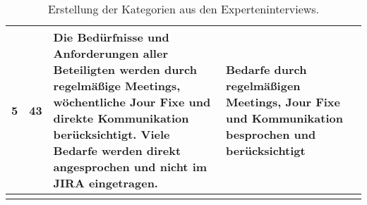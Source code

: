 \begin{longtable}{| p{0.5cm} | p{0.5cm} | p{4cm} | p{4cm} | p{4cm} |}
	\cline{1-4}
	5 & 43 & Die Bedürfnisse und Anforderungen aller Beteiligten werden durch regelmäßige Meetings, wöchentliche Jour Fixe und direkte Kommunikation berücksichtigt. Viele Bedarfe werden direkt angesprochen und nicht im JIRA eingetragen. & Bedarfe durch regelmäßigen Meetings, Jour Fixe und Kommunikation besprochen und berücksichtigt & \\ 
	\hline
	\caption{Erstellung der Kategorien aus den Experteninterviews.\label{tab:kategorien}}\\
\end{longtable}
